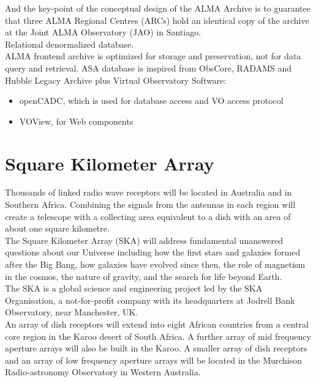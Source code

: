 And the key-point of the conceptual design of the ALMA Archive is to guarantee that three ALMA Regional Centres (ARCs) hold an identical copy of the archive at the Joint ALMA Observatory (JAO) in Santiago. \\

Relational denormalized database.\\

ALMA frontend archive is optimized for storage and preservation, not for data query and retrieval. ASA database is inspired from ObsCore, RADAMS and Hubble Legacy Archive plus Virtual Observatory Software:

\begin{itemize}
\item openCADC, which is used for database access and VO access protocol
\item VOView, for Web components
\end{itemize}




\section{Square Kilometer Array}

Thousands of linked radio wave receptors will be located in Australia and in Southern Africa. Combining the signals from the antennas in each region will create a telescope with a collecting area equivalent to a dish with an area of about one square kilometre. \\

The Square Kilometer Array (SKA) will address fundamental unanswered questions about our Universe including how the first stars and galaxies formed after the Big Bang, how galaxies have evolved since then, the role of magnetism in the cosmos, the nature of gravity, and the search for life beyond Earth. \\

The SKA is a global science and engineering project led by the SKA Organisation, a not-for-profit company with its headquarters at Jodrell Bank Observatory, near Manchester, UK. \\

An array of dish receptors will extend into eight African countries from a central core region in the Karoo desert of South Africa. A further array of mid frequency aperture arrays will also be built in the Karoo. A smaller array of dish receptors and an array of low frequency aperture arrays will be located in the Murchison Radio-astronomy Observatory in Western Australia.\\

